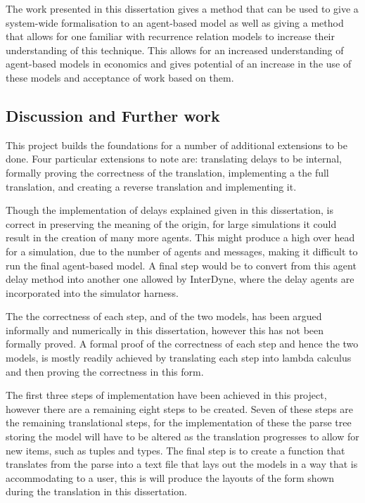 \documentclass{article}
\begin{document}
The work presented in this dissertation gives a method that can be used to give a system-wide formalisation to an agent-based model as well as giving a method that allows for one familiar with recurrence relation models to increase their understanding of this technique. This allows for an increased understanding of agent-based models in economics and gives potential of an increase in the use of these models and acceptance of work based on them.   

\subsection{Discussion and Further work } \label{furtherwork}


This project builds the foundations for a number of additional extensions to be done. Four particular extensions to note are: translating delays to be internal, formally proving the correctness of the translation, implementing a the full translation, and creating a reverse translation and implementing it.     

Though the implementation of delays explained given in this dissertation, is correct in preserving the meaning of the origin, for large simulations it could result in the creation of many more agents. This might produce a high over head for a simulation, due to the number of agents and messages, making it difficult to run the final agent-based model. A final step would be to convert from this agent delay method into another one allowed by InterDyne, where the delay agents are incorporated into the simulator harness.  

The the correctness of each step, and of the two models, has been argued informally and numerically in this dissertation, however this has not been formally proved. A formal proof of the correctness of each step and hence the two models, is mostly readily achieved by translating each step into lambda calculus and then proving the correctness in this form. 

The first three steps of implementation have been achieved in this project, however there are a remaining eight steps to be created. Seven of these steps are the remaining translational steps, for the implementation of these the parse tree storing the model will have to be altered as the translation progresses to allow for new items, such as tuples and types. The final step is to create a function that translates from the parse into a text file that lays out the models in a way that is accommodating to a user, this is will produce the layouts of the form shown during the translation in this dissertation.    
\end{document}
